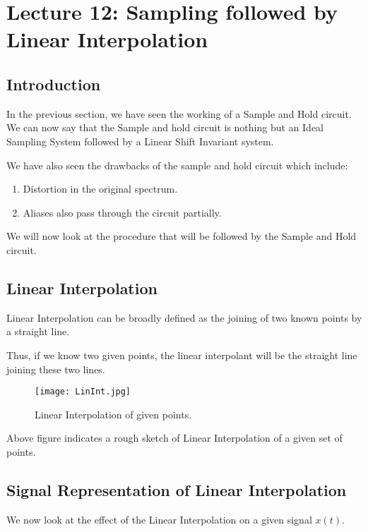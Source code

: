 \section{Lecture 12: Sampling followed by Linear Interpolation}


\subsection{Introduction}
In the previous section, we have seen the working of a Sample and Hold circuit. We can now say that the Sample and hold circuit is nothing but an Ideal Sampling System followed by a Linear Shift Invariant system.

We have also seen the drawbacks of the sample and hold circuit which include:

\begin{enumerate}
\item Distortion in the original spectrum.
\item Aliases also pass through the circuit partially.
\end{enumerate}

We will now look at the procedure that will be followed by the Sample and Hold circuit.
\subsection{Linear Interpolation}
Linear Interpolation can be broadly defined as the joining of two known points by a straight line.

Thus, if we know two given points, the linear interpolant will be the straight line joining these two lines. 

\begin{figure}[h]
\centering
\texttt{[image: LinInt.jpg]}
\caption{Linear Interpolation of given points.}
\end{figure}

Above figure indicates a rough sketch of Linear Interpolation of a given set of points. 



\pagebreak

\subsection{Signal Representation of Linear Interpolation}

We now look at the effect of the Linear Interpolation on a given signal $x(t)$.

